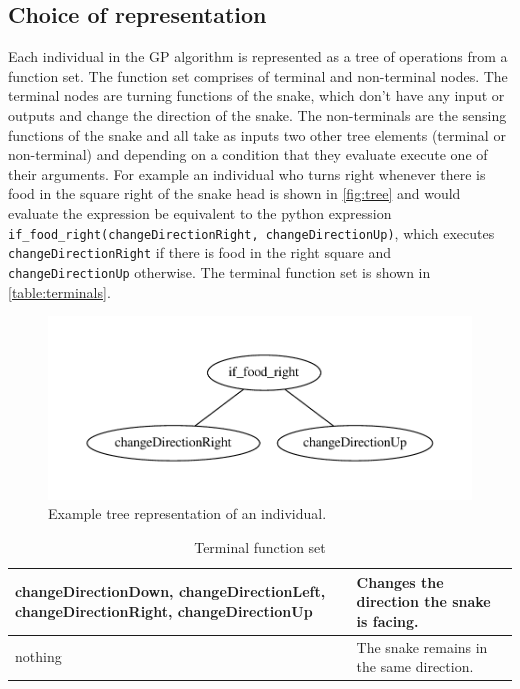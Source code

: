 \documentclass[12pt,a4paper]{article}
\begin{document}
		
	\subsection{Choice of representation}
	Each individual in the GP algorithm is represented as a tree of operations from a function set. The function set comprises of terminal and non-terminal nodes. The terminal nodes are turning functions of the snake, which don't have any input or outputs and change the direction of the snake. The non-terminals are the sensing functions of the snake and all take as inputs two other tree elements (terminal or non-terminal) and depending on a condition that they evaluate execute one of their arguments. For example an individual who turns right whenever there is food in the square right of the snake head is shown in \autoref{fig:tree} and would evaluate the expression be equivalent to the python expression \lstinline|if_food_right(changeDirectionRight, changeDirectionUp)|, which executes \lstinline|changeDirectionRight| if there is food in the right square and \lstinline|changeDirectionUp| otherwise. The terminal function set is shown in \autoref{table:terminals}. 
	
	\begin{figure}[h!]
		\centering
		\includegraphics[width=0.7\linewidth]{figures/tree}
		\caption{Example tree representation of an individual.}
		\label{fig:tree}
	\end{figure}
	
	\begin{table}[]
		\centering
		\begin{tabu} to \textwidth {|X[l]|X[l]|}
			\hline
			changeDirectionDown, changeDirectionLeft, changeDirectionRight, changeDirectionUp & Changes the direction the snake is facing. \\  
			\hline
			nothing & The snake remains in the same direction.  \\  
			\hline
		\end{tabu}
		
		\caption{Terminal function set}
		\label{table:terminals}
	\end{table}
	
\end{document}
